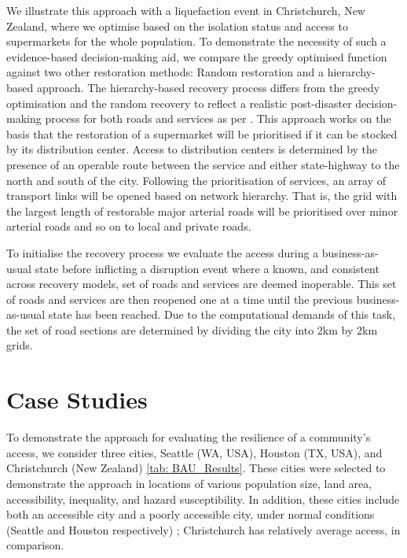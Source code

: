 \documentclass[review,3p,times,onecolumn,sort&compress,12pt]{elsarticle}
\let \cite \parencite
\begin{document}
We illustrate this approach with a liquefaction event in Christchurch, New Zealand, where we optimise based on the isolation status and access to supermarkets for the whole population.
To demonstrate the necessity of such a evidence-based decision-making aid, we compare the greedy optimised function against two other restoration methods: Random restoration and a hierarchy-based approach.
The hierarchy-based recovery process differs from the greedy optimisation and the random recovery to reflect a realistic post-disaster decision-making process for both roads and services as per \textcite{Wellington_Region_Emergency_Management_Office_Wellington_Lifelines_Group2013-ou}.
This approach works on the basis that the restoration of a supermarket will be prioritised if it can be stocked by its distribution center.
Access to distribution centers is determined by the presence of an operable route between the service and either state-highway to the north and south of the city.
Following the prioritisation of services, an array of transport links will be opened based on network hierarchy.
That is, the grid with the largest length of restorable major arterial roads will be prioritised over minor arterial roads and so on to local and private roads.

To initialise the recovery process we evaluate the access during a business-as-usual state before inflicting a disruption event where a known, and consistent across recovery models, set of roads and services are deemed inoperable.
This set of roads and services are then reopened one at a time until the previous business-as-usual state has been reached.
Due to the computational demands of this task, the set of road sections are determined by dividing the city into 2km by 2km grids.




\section{Case Studies}
To demonstrate the approach for evaluating the resilience of a community's access, we consider three cities, Seattle (WA, USA), Houston (TX, USA), and Christchurch (New Zealand)  \autoref{tab: BAU_Results}.
These cities were selected to demonstrate the approach in locations of various population size, land area, accessibility, inequality, and hazard susceptibility.
In addition, these cities include both an accessible city and a poorly accessible city, under normal conditions (Seattle and Houston respectively) \cite{Logan2021-ineq}; Christchurch has relatively average access, in comparison.
\end{document}
